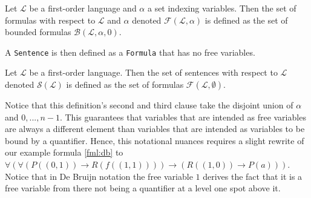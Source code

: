 \begin{definition}[Formula]\label{def:formula}
    Let $\mathcal{L}$ be a first-order language and $\alpha$ a set indexing variables. Then the set of formulas with respect to $\mathcal{L}$ and $\alpha$ denoted $\mathcal{F}(\mathcal{L},\alpha)$ is defined as the set of bounded formulas $\mathcal{B}(\mathcal{L},\alpha,0)$.
\end{definition}

A \texttt{Sentence} is then defined as a \texttt{Formula} that has no free variables.

\begin{definition}[Sentence]\label{def:sentence}
    Let $\mathcal{L}$ be a first-order language. Then the set of sentences with respect to $\mathcal{L}$ denoted $\mathcal{S}(\mathcal{L})$ is defined as the set of formulas $\mathcal{F}(\mathcal{L},\emptyset)$.
\end{definition}



Notice that this definition's second and third clause take the disjoint union of $\alpha$ and ${0,...,n-1}$. This guarantees that variables that are intended as free variables are always a different element than variables that are intended as variables to be bound by a quantifier. Hence, this notational nuances requires a slight rewrite of our example formula \ref{fml:db} to $\forall(\forall(P((0,1)) \rightarrow R(f((1,1)))) \to (R((1,0)) \to P(a)))$. Notice that in De Bruijn notation the free variable $1$ derives the fact that it is a free variable from there not being a quantifier at a level one spot above it.  

